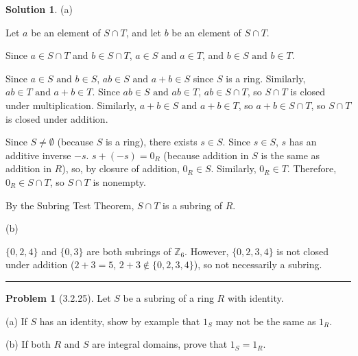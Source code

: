\documentclass[12pt]{article}
\theoremstyle{definition}
\newtheorem*{prob}{Problem}
\newtheorem*{soln}{Solution}
\newcommand{\hr}{\vspace*{\parskip}\hrule}
\newcommand{\ZZ}{{\mathbb{Z}}}
\begin{document}
\begin{soln}

(a)

Let $a$ be an element of $S\cap T$, and let $b$ be an element of $S\cap T$.

\renewcommand\land{\text{ and }}
Since $a\in S\cap T$ and $b\in S\cap T$, $a\in S\land a\in T$, and $b\in S\land b\in T$.

Since $a\in S\land b\in S$, $ab\in S\land a+b\in S$ since $S$ is a ring.
Similarly, $ab\in T\land a+b\in T$.
Since $ab\in S\land ab\in T$, $ab\in S\cap T$, so $S\cap T$ is closed under multiplication.
Similarly, $a+b\in S\land a+b\in T$, so $a+b\in S\cap T$, so $S\cap T$ is closed under addition.

Since $S\neq\emptyset$ (because $S$ is a ring), there exists $s\in S$.
Since $s\in S$, $s$ has an additive inverse $-s$.
$s+(-s)=0_R$ (because addition in $S$ is the same as addition in $R$),
so, by closure of addition, $0_R\in S$.
Similarly, $0_R\in T$.
Therefore, $0_R\in S\cap T$, so $S\cap T$ is nonempty.

By the Subring Test Theorem, $S\cap T$ is a subring of $R$.

(b)

$\{0, 2, 4\}$ and $\{0, 3\}$ are both subrings of $\ZZ_6$.
However, $\{0, 2, 3, 4\}$ is not closed under addition
($2+3=5$, $2+3\not\in\{0,2,3,4\}$),
so not necessarily a subring.

\end{soln}

\hr


%
%
%
%


\begin{prob}[3.2.25] Let $S$ be a subring of a ring $R$ with identity.

(a) If $S$ has an identity, show by example that $1_S$ may not be the same as $1_R$.

(b) If both $R$ and $S$ are integral domains, prove that $1_S=1_R$.
\end{prob}
\end{document}

